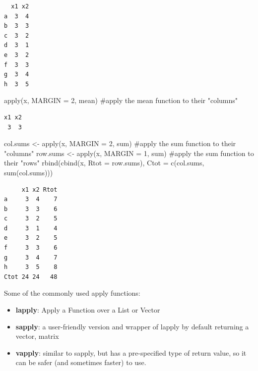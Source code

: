 \documentclass[
  letterpaper,
  DIV=11,
  numbers=noendperiod]{scrreprt}
\newenvironment{Shaded}{\begin{snugshade}}{\end{snugshade}}
\newcommand{\AttributeTok}[1]{\textcolor[rgb]{0.40,0.45,0.13}{#1}}
\newcommand{\CommentTok}[1]{\textcolor[rgb]{0.37,0.37,0.37}{#1}}
\newcommand{\DecValTok}[1]{\textcolor[rgb]{0.68,0.00,0.00}{#1}}
\newcommand{\FunctionTok}[1]{\textcolor[rgb]{0.28,0.35,0.67}{#1}}
\newcommand{\NormalTok}[1]{\textcolor[rgb]{0.00,0.23,0.31}{#1}}
\newcommand{\OtherTok}[1]{\textcolor[rgb]{0.00,0.23,0.31}{#1}}
\begin{document}
\begin{verbatim}
  x1 x2
a  3  4
b  3  3
c  3  2
d  3  1
e  3  2
f  3  3
g  3  4
h  3  5
\end{verbatim}

\begin{Shaded}
\begin{Highlighting}[]
\FunctionTok{apply}\NormalTok{(x, }\AttributeTok{MARGIN =} \DecValTok{2}\NormalTok{, mean) }\CommentTok{\#apply the mean function to their "columns"}
\end{Highlighting}
\end{Shaded}

\begin{verbatim}
x1 x2 
 3  3 
\end{verbatim}

\begin{Shaded}
\begin{Highlighting}[]
\NormalTok{col.sums }\OtherTok{\textless{}{-}} \FunctionTok{apply}\NormalTok{(x, }\AttributeTok{MARGIN =} \DecValTok{2}\NormalTok{, sum) }\CommentTok{\#apply the sum function to their "columns"}
\NormalTok{row.sums }\OtherTok{\textless{}{-}} \FunctionTok{apply}\NormalTok{(x, }\AttributeTok{MARGIN =} \DecValTok{1}\NormalTok{, sum) }\CommentTok{\#apply the sum function to their "rows"}
\FunctionTok{rbind}\NormalTok{(}\FunctionTok{cbind}\NormalTok{(x, }\AttributeTok{Rtot =}\NormalTok{ row.sums), }\AttributeTok{Ctot =} \FunctionTok{c}\NormalTok{(col.sums, }\FunctionTok{sum}\NormalTok{(col.sums)))}
\end{Highlighting}
\end{Shaded}

\begin{verbatim}
     x1 x2 Rtot
a     3  4    7
b     3  3    6
c     3  2    5
d     3  1    4
e     3  2    5
f     3  3    6
g     3  4    7
h     3  5    8
Ctot 24 24   48
\end{verbatim}

Some of the commonly used apply functions:

\begin{itemize}
\item
  \textbf{lapply}: Apply a Function over a List or Vector
\item
  \textbf{sapply}: a user-friendly version and wrapper of lapply by
  default returning a vector, matrix
\item
  \textbf{vapply}: similar to sapply, but has a pre-specified type of
  return value, so it can be safer (and sometimes faster) to use.
\end{itemize}
\end{document}
